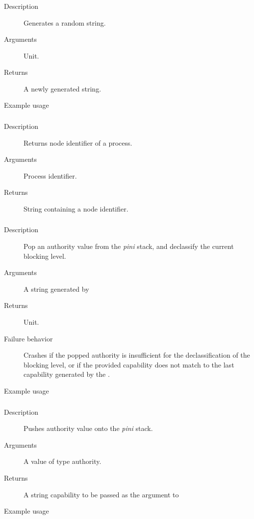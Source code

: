 \subsubsection{}
\begin{description}
    \item [Description] Generates a random string.
    \item [Arguments] Unit.
    \item [Returns] A newly generated string.
    \item [Example usage] 
\end{description}


\subsubsection{}
\begin{description}
    \item [Description] Returns node identifier of a process.
    \item [Arguments] Process identifier.
    \item [Returns] String containing a node identifier.
\end{description}


\subsubsection{}
\begin{description}
    \item [Description] Pop an authority value from the \emph{pini} stack, and declassify the current blocking level.
    \item [Arguments] A string generated by 
    \item [Returns] Unit.
    \item [Failure behavior] Crashes if the popped authority is insufficient for the declassification of the blocking level,
or if the provided capability does not match to the last capability generated by the .
    \item [Example usage] 
\end{description}


\subsubsection{}
\begin{description}
    \item [Description] Pushes authority value onto the \emph{pini} stack.
    \item [Arguments] A value of type authority.
    \item [Returns] A string capability to be passed as the argument to 
    \item [Example usage] 
\end{description}


